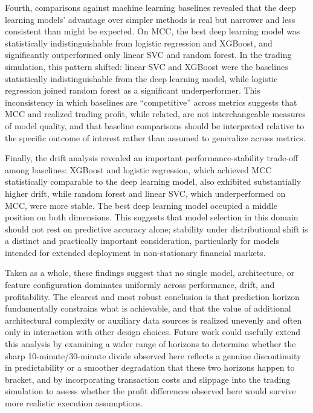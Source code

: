 \documentclass[stu,floatsintext]{apa7}
\begin{document}
Fourth, comparisons against machine learning baselines revealed that the deep learning models' advantage over simpler methods is real but narrower and less consistent than might be expected. On MCC, the best deep learning model was statistically indistinguishable from logistic regression and XGBoost, and significantly outperformed only linear SVC and random forest. In the trading simulation, this pattern shifted: linear SVC and XGBoost were the baselines statistically indistinguishable from the deep learning model, while logistic regression joined random forest as a significant underperformer. This inconsistency in which baselines are ``competitive'' across metrics suggests that MCC and realized trading profit, while related, are not interchangeable measures of model quality, and that baseline comparisons should be interpreted relative to the specific outcome of interest rather than assumed to generalize across metrics.

Finally, the drift analysis revealed an important performance-stability trade-off among baselines: XGBoost and logistic regression, which achieved MCC statistically comparable to the deep learning model, also exhibited substantially higher drift, while random forest and linear SVC, which underperformed on MCC, were more stable. The best deep learning model occupied a middle position on both dimensions. This suggests that model selection in this domain should not rest on predictive accuracy alone; stability under distributional shift is a distinct and practically important consideration, particularly for models intended for extended deployment in non-stationary financial markets.

Taken as a whole, these findings suggest that no single model, architecture, or feature configuration dominates uniformly across performance, drift, and profitability. The clearest and most robust conclusion is that prediction horizon fundamentally constrains what is achievable, and that the value of additional architectural complexity or auxiliary data sources is realized unevenly and often only in interaction with other design choices. Future work could usefully extend this analysis by examining a wider range of horizons to determine whether the sharp 10-minute/30-minute divide observed here reflects a genuine discontinuity in predictability or a smoother degradation that these two horizons happen to bracket, and by incorporating transaction costs and slippage into the trading simulation to assess whether the profit differences observed here would survive more realistic execution assumptions.
\end{document}
